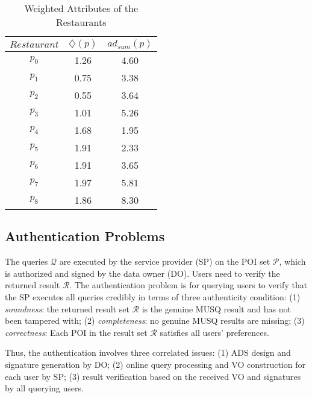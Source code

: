 \documentclass[10pt, conference, compsocconf]{IEEEtran}
\begin{document}
\begin{table}
	\begin{center}\scriptsize
		\begin{tabular}{|c|c|c|}
			\hline
			$Restaurant$ & $\diamondsuit(p)$ & $ad_{sum}(p)$ \\
			\hline
			$p_0$ & 1.26 & 4.60 \\
			$p_1$ & 0.75 & 3.38 \\
			$p_2$ & 0.55 & 3.64 \\
			$p_3$ & 1.01 & 5.26 \\
			$p_4$ & 1.68 & 1.95 \\	
			$p_5$ & 1.91 & 2.33 \\
			$p_6$ & 1.91 & 3.65 \\
			$p_7$ & 1.97 & 5.81 \\	
			$p_8$ & 1.86 & 8.30 \\		
			\hline
		\end{tabular}
	\end{center}
	\caption{Weighted Attributes of the Restaurants}\label{Restaurants}
\end{table}


\subsection{Authentication Problems}

The queries $\mathcal{Q}$ are executed by the service provider (SP) on the POI set $\mathcal{P}$, which is authorized and signed by the data owner (DO). Users need to verify the returned result $\mathcal{R}$. The authentication problem is for querying users to verify that the SP executes all queries credibly in terms of three authenticity condition: (1) \emph{soundness}: the returned result set $\mathcal{R}$ is the genuine MUSQ result and has not been tampered with; (2) \emph{completeness}: no genuine MUSQ results are missing; (3) \emph{correctness}: Each POI in the result set $\mathcal{R}$ satisfies all users' preferences. 

Thus, the authentication involves three correlated issues: (1) ADS design and signature generation by DO; (2) online query processing and VO construction for each user by SP; (3) result verification based on the received VO and signatures by all querying users.
\end{document}
